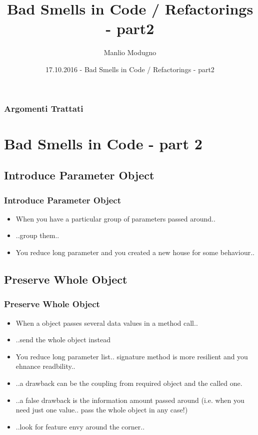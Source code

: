 \documentclass{beamer}
\title{Bad Smells in Code / Refactorings - part2}
\author{Manlio Modugno}
\institute[GMTechnologies]
\date[17.10.2016] 
{17.10.2016 - Bad Smells in Code / Refactorings - part2}
\begin{document}
\begin{frame}
  \titlepage
\end{frame}

\begin{frame}
  \frametitle{Argomenti Trattati}
  \tableofcontents
\end{frame}

\section{Bad Smells in Code - part 2}
\subsection{Introduce Parameter Object}
\begin{frame}
  \frametitle{Introduce Parameter Object}
  \begin{itemize}
	\item<+-> When you have a particular group of parameters passed around..
	\item<+-> ..group them..
	\item<+-> You reduce long parameter and you created a new house for some behaviour..
  \end{itemize}
\end{frame}


\subsection{Preserve Whole Object}
\begin{frame}
  \frametitle{Preserve Whole Object}
  \begin{itemize}
	\item<+-> When a object passes several data values in a method call..
	\item<+-> ..send the whole object instead
	\item<+-> You reduce long parameter list.. signature method is more resilient and you ehnance readbility..
	\item<+-> ..a drawback can be the coupling from required object and the called one.
	\item<+-> ..a false drawback is the information amount passed around (i.e. when you need just one value.. pass the whole object in any case!)
	\item<+-> ..look for feature envy around the corner..
  \end{itemize}
\end{frame}
\end{document}
